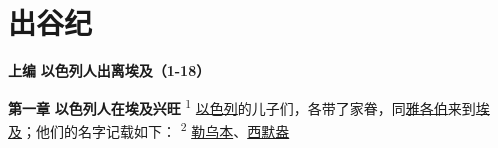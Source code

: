 \chapter{出谷纪}

\begin{center}
	\textbf{上编 }
	\textbf{以色列人出离埃及（1-18）}
\end{center}

\textbf{第一章 }
\textbf{以色列人在埃及兴旺 }
\textsuperscript{1}
\uline{以色列}的儿子们，各带了家眷，同\uline{雅各伯}来到\uline{埃及}；他们的名字记载如下：
\textsuperscript{2}
\uline{勒乌本}、\uline{西默盎}